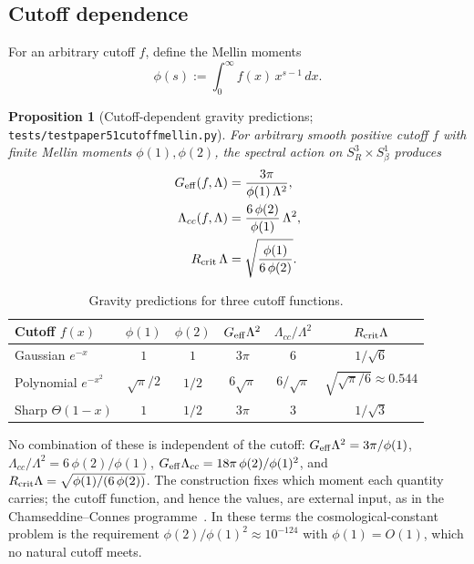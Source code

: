 \documentclass[11pt,a4paper]{article}
\theoremstyle{plain}
\newtheorem{proposition}[theorem]{Proposition}
\theoremstyle{definition}
\newcommand{\sthree}{S^{3}}
\newcommand{\Lcc}{\Lambda_{cc}}
\newcommand{\Geff}{G_{\rm eff}}
\newcommand{\Rcrit}{R_{\rm crit}}
\renewcommand{\_}{\textunderscore\allowbreak}
\begin{document}
\subsection{Cutoff dependence}
\label{sec:g8}

For an arbitrary cutoff $f$, define the Mellin moments
\begin{equation}
  \phi(s) := \int_0^\infty f(x)\, x^{s-1}\, dx .
\end{equation}

\begin{proposition}[Cutoff-dependent gravity predictions; \texttt{tests/test\_paper51\_cutoff\_mellin.py}]
\label{thm:cutoff_dep}
For arbitrary smooth positive cutoff $f$ with finite Mellin moments
$\phi(1), \phi(2)$, the spectral action on $\sthree_R \times
S^1_\beta$ produces
\begin{align}
  \Geff(f, \Lambda) &= \frac{3 \pi}{\phi(1)\, \Lambda^2}, \\
  \Lcc(f, \Lambda) &= \frac{6\, \phi(2)}{\phi(1)}\, \Lambda^2, \\
  \Rcrit\, \Lambda &= \sqrt{\frac{\phi(1)}{6\, \phi(2)}}.
\end{align}
\end{proposition}

\begin{table}[h]
  \centering
  \caption{Gravity predictions for three cutoff functions.}
  \begin{tabular}{l c c c c c}
    \toprule
    Cutoff $f(x)$
      & $\phi(1)$
      & $\phi(2)$
      & $\Geff \Lambda^2$
      & $\Lcc/\Lambda^2$
      & $\Rcrit \Lambda$ \\
    \midrule
    Gaussian $e^{-x}$
      & $1$ & $1$ & $3\pi$ & $6$ & $1/\sqrt{6}$ \\
    Polynomial $e^{-x^2}$
      & $\sqrt{\pi}/2$ & $1/2$ & $6\sqrt{\pi}$ & $6/\sqrt{\pi}$
      & $\sqrt{\sqrt{\pi}/6} \approx 0.544$ \\
    Sharp $\Theta(1-x)$
      & $1$ & $1/2$ & $3\pi$ & $3$ & $1/\sqrt{3}$ \\
    \bottomrule
  \end{tabular}
  \label{tab:g8_cutoffs}
\end{table}

No combination of these is independent of the cutoff:
$\Geff \Lambda^2 = 3\pi/\phi(1)$,
$\Lcc / \Lambda^2 = 6\, \phi(2)/\phi(1)$,
$\Geff \Lcc = 18 \pi\, \phi(2)/\phi(1)^2$, and
$\Rcrit \Lambda = \sqrt{\phi(1)/(6\, \phi(2))}$. The construction fixes
which moment each quantity carries; the cutoff function, and hence the
values, are external input, as in the Chamseddine--Connes
programme~\cite{chamseddine_connes1997, chamseddine_connes2010}. In these
terms the cosmological-constant problem is the requirement
$\phi(2)/\phi(1)^2 \approx 10^{-124}$ with $\phi(1) = O(1)$, which no
natural cutoff meets.
\end{document}
